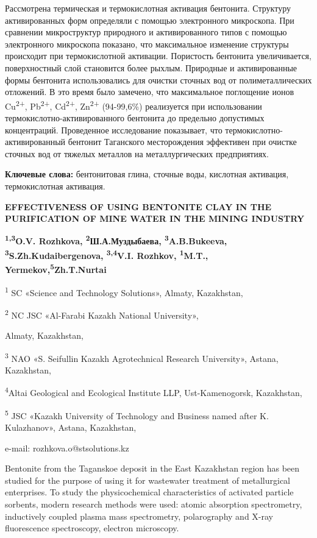 Рассмотрена термическая и термокислотная активация бентонита. Структуру
активированных форм определяли с помощью электронного микроскопа. При
сравнении микроструктур природного и активированного типов с помощью
электронного микроскопа показано, что максимальное изменение структуры
происходит при термокислотной активации. Пористость бентонита
увеличивается, поверхностный слой становится более рыхлым. Природные и
активированные формы бентонита использовались для очистки сточных вод от
полиметаллических отложений. В это время было замечено, что максимальное
поглощение ионов Cu\textsuperscript{2+}, Pb\textsuperscript{2+},
Cd\textsuperscript{2+}, Zn\textsuperscript{2+} (94-99,6\%) реализуется
при использовании термокислотно-активированного бентонита до предельно
допустимых концентраций. Проведенное исследование показывает, что
термокислотно-активированный бентонит Таганского месторождения
эффективен при очистке сточных вод от тяжелых металлов на
металлургических предприятиях.

{\bfseries Ключевые слова:} бентонитовая глина, сточные воды, кислотная
активация, термокислотная активация.

\begin{center}
{\large\bfseries EFFECTIVENESS OF USING BENTONITE CLAY IN THE PURIFICATION OF
MINE WATER IN THE MINING INDUSTRY}

{\bfseries \textsuperscript{1,3}O.V. Rozhkova\envelope, \textsuperscript{2}Ш.А.Муздыбаева, \textsuperscript{3}A.B.Bukeeva, \textsuperscript{3}S.Zh.Kudaibergenova, \textsuperscript{3,4}V.I. Rozhkov, \textsuperscript{1}M.T., Yermekov,\textsuperscript{5}Zh.T.Nurtai}

\textsuperscript{1} SC «Science and Technology Solutions», Almaty,
Kazakhstan,

\textsuperscript{2} NC JSC «Al-Farabi Kazakh National University»,

Almaty, Kazakhstan,

\textsuperscript{3} NAO «S. Seifullin Kazakh Agrotechnical Research
University», Astana, Kazakhstan,

\textsuperscript{4}Altai Geological and Ecological Institute LLP,
Ust-Kamenogorsk, Kazakhstan,

\textsuperscript{5} JSC «Kazakh University of Technology and Business
named after K. Kulazhanov», Astana, Kazakhstan,

e-mail: rozhkova.o@stsolutions.kz
\end{center}

Bentonite from the Taganskoe deposit in the East Kazakhstan region has
been studied for the purpose of using it for wastewater treatment of
metallurgical enterprises. To study the physicochemical characteristics
of activated particle sorbents, modern research methods were used:
atomic absorption spectrometry, inductively coupled plasma mass
spectrometry, polarography and X-ray fluorescence spectroscopy, electron
microscopy.

